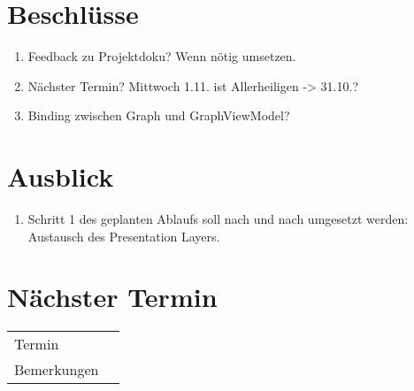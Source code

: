 \documentclass[11pt, a4paper,oneside]{scrartcl}
\begin{document}
\section{Beschlüsse}
\begin{enumerate}
	\item Feedback zu Projektdoku? Wenn nötig umsetzen.
	\item Nächster Termin? Mittwoch 1.11. ist Allerheiligen -> 31.10.?
	\item Binding zwischen Graph und GraphViewModel?
\end{enumerate}

\section{Ausblick}
\begin{enumerate}
	\item Schritt 1 des geplanten Ablaufs soll nach und nach umgesetzt werden: Austausch des Presentation Layers.
\end{enumerate}

\section{Nächster Termin}
\begin{tabu} to \linewidth {l X }
	\toprule
	Termin &  \\
	Bemerkungen & \\
	\bottomrule
\end{tabu}
\end{document}
